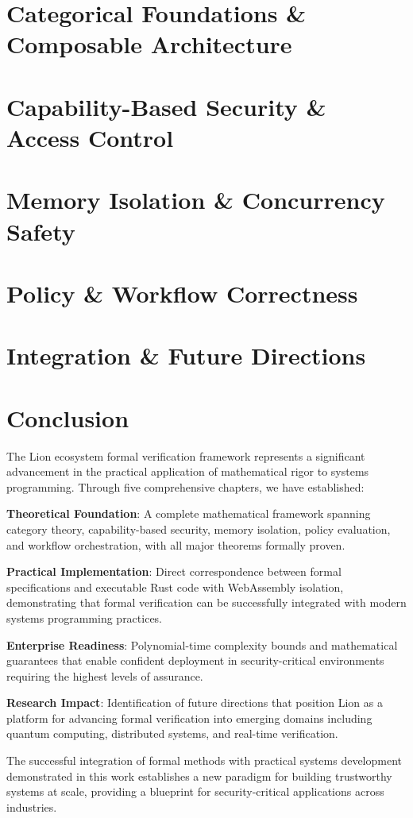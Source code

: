 \documentclass[11pt,a4paper]{book}
\theoremstyle{definition}
\theoremstyle{remark}
\begin{document}
\tableofcontents

\chapter{Categorical Foundations \& Composable Architecture}


\chapter{Capability-Based Security \& Access Control}


\chapter{Memory Isolation \& Concurrency Safety}


\chapter{Policy \& Workflow Correctness}


\chapter{Integration \& Future Directions}


\nocite{*}  %


\chapter{Conclusion}

The Lion ecosystem formal verification framework represents a significant advancement in the practical application of mathematical rigor to systems programming. Through five comprehensive chapters, we have established:

\textbf{Theoretical Foundation}: A complete mathematical framework spanning category theory, capability-based security, memory isolation, policy evaluation, and workflow orchestration, with all major theorems formally proven.

\textbf{Practical Implementation}: Direct correspondence between formal specifications and executable Rust code with WebAssembly isolation, demonstrating that formal verification can be successfully integrated with modern systems programming practices.

\textbf{Enterprise Readiness}: Polynomial-time complexity bounds and mathematical guarantees that enable confident deployment in security-critical environments requiring the highest levels of assurance.

\textbf{Research Impact}: Identification of future directions that position Lion as a platform for advancing formal verification into emerging domains including quantum computing, distributed systems, and real-time verification.

The successful integration of formal methods with practical systems development demonstrated in this work establishes a new paradigm for building trustworthy systems at scale, providing a blueprint for security-critical applications across industries.
\end{document}
